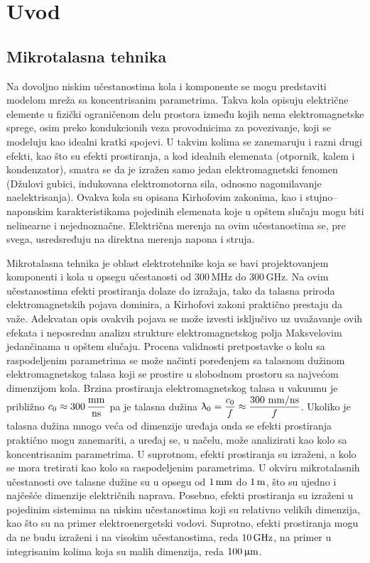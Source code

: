 \documentclass[a4paper, 12pt, diplomski]{etf}
\newcommand{\unit}[1]{\,{\rm #1}}
\newcommand{\DS}{\displaystyle}
\begin{document}
\newpage

\section{Uvod}
\subsection{Mikrotalasna tehnika}
Na dovoljno niskim učestanostima kola i komponente se mogu predstaviti modelom mreža sa koncentrisanim 
parametrima. Takva kola opisuju električne elemente u fizički ograničenom delu prostora između kojih nema elektromagnetske sprege, osim preko kondukcionih veza provodnicima za povezivanje, koji se
modeluju kao idealni kratki spojevi. 
U takvim kolima se zanemaruju i razni drugi 
efekti, kao što su efekti prostiranja, a kod 
idealnih elemenata (otpornik, kalem i 
kondenzator), smatra se da je izražen samo 
jedan elektromagnetski fenomen (Džulovi gubici, indukovana elektromotorna sila, odnosno nagomilavanje naelektrisanja).
Ovakva kola su opisana 
Kirhofovim zakonima, kao i stujno--naponskim karakteristikama
pojedinih elemenata koje u opštem slučaju mogu biti 
nelinearne i nejednoznačne. Električna merenja na ovim učestanostima 
se, pre svega, usredsređuju na direktna merenja napona i struja.

Mikrotalasna tehnika je oblast elektrotehnike koja se bavi projektovanjem komponenti
i kola u opsegu učestanosti od 300\,MHz do 300\,GHz. Na ovim učestanostima
efekti prostiranja dolaze do izražaja, tako da talasna priroda elektromagnetskih pojava dominira,
a Kirhofovi zakoni praktično prestaju da važe. Adekvatan opis ovakvih pojava se može izvesti isključivo 
uz uvažavanje ovih efekata i neposrednu analizu strukture elektromagnetskog polja Maksvelovim 
jedančinama u opštem slučaju. 
Procena validnosti pretpostavke o kolu sa raspodeljenim parametrima se može načinti poređenjem sa talasnom dužinom elektromagnetskog talasa koji se prostire u slobodnom prostoru sa najvećom dimenzijom kola.
Brzina prostiranja elektromagnetskog talasa u vakuumu je približno $c_0 \approx 300\unit{\dfrac{mm}{ns}}$
pa je talasna dužina 
$\DS \uplambda_0 = \frac{c_0}{f} \approx \frac{300
\,{\unit{mm/ns}}}{f}$.
Ukoliko je talasna dužina mnogo veća od dimenzije uređaja onda se efekti prostiranja praktično mogu zanemariti,
a uređaj se, u načelu, može analizirati kao kolo sa koncentrisanim parametrima. U suprotnom, efekti
prostiranja su izraženi, a kolo se mora tretirati kao kolo sa raspodeljenim parametrima. U okviru mikrotalasnih učestanosti ove talasne dužine su u
 opsegu od $1\unit{mm}$ do $1\unit{m}$, što su ujedno i najčešće dimenzije 
 električnih naprava. Posebno, efekti prostiranja su izraženi u pojedinim
 sistemima na niskim učestanostima koji su relativno velikih dimenzija, 
 kao 
 što su na primer 
elektroenergetski vodovi.
Suprotno, efekti prostiranja mogu 
 da ne budu izraženi i na visokim učestanostima, reda $10\unit{GHz}$, na 
 primer u integrisanim kolima koja su malih dimenzija, reda $100\unit{\upmu m}$.
 \cite{djordjevic-mw, pozar}
\end{document}
